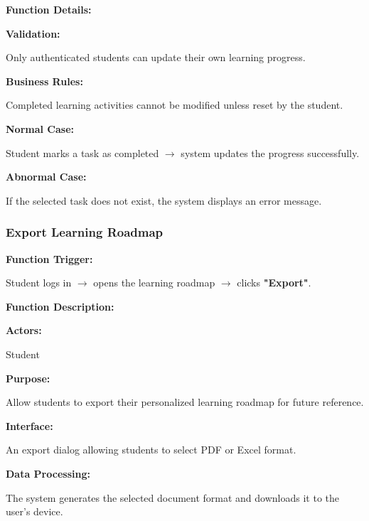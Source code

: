 \vspace{0.3cm}

\textbf{Function Details:}

\textbf{Validation:}

Only authenticated students can update their own learning progress.

\textbf{Business Rules:}

Completed learning activities cannot be modified unless reset by the student.

\textbf{Normal Case:}

Student marks a task as completed $\rightarrow$ system updates the progress successfully.

\textbf{Abnormal Case:}

If the selected task does not exist, the system displays an error message.



\subsubsection{Export Learning Roadmap}

\textbf{Function Trigger:}

Student logs in $\rightarrow$ opens the learning roadmap $\rightarrow$ clicks \textbf{"Export"}.

\vspace{0.3cm}

\textbf{Function Description:}

\textbf{Actors:}

Student

\vspace{0.2cm}

\textbf{Purpose:}

Allow students to export their personalized learning roadmap for future reference.

\vspace{0.2cm}

\textbf{Interface:}

An export dialog allowing students to select PDF or Excel format.

\vspace{0.2cm}

\textbf{Data Processing:}

The system generates the selected document format and downloads it to the user's device.


